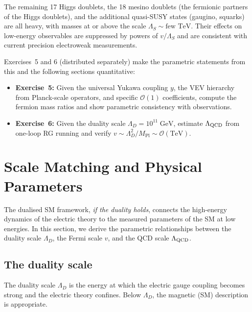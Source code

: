 \documentclass[11pt,a4paper]{article}
\begin{document}
The remaining 17 Higgs doublets, the 18 mesino doublets (the fermionic
partners of the Higgs doublets), and the additional quasi-SUSY states
(gaugino, squarks) are all heavy, with masses at or above the scale
$\Lambda_S \sim \text{few TeV}$.  Their effects on low-energy
observables are suppressed by powers of $v / \Lambda_S$ and are
consistent with current precision electroweak measurements.

\begin{previewbox}[title={Preview: Exercises 5 and 6}]
  Exercises~5 and 6 (distributed separately) make the parametric
  statements from this and the following sections quantitative:
  \begin{itemize}
    \item \textbf{Exercise~5:} Given the universal Yukawa coupling $y$,
      the VEV hierarchy from Planck-scale operators, and specific
      $\mathcal{O}(1)$ coefficients, compute the fermion mass ratios
      and show parametric consistency with observations.
    \item \textbf{Exercise~6:} Given the duality scale
      $\Lambda_D = 10^{11}\;\text{GeV}$, estimate $\Lambda_{\mathrm{QCD}}$ from
      one-loop RG running and verify $v \sim \Lambda_D^2 / M_{\text{Pl}}
      \sim \mathcal{O}(\text{TeV})$.
  \end{itemize}
\end{previewbox}


\section{Scale Matching and Physical Parameters}
\label{sec:scale-matching}

The dualised SM framework, \emph{if the duality holds}, connects the
high-energy dynamics of the electric theory to the measured parameters
of the SM at low energies.  In this section, we derive the parametric
relationships between the duality scale $\Lambda_D$, the Fermi scale
$v$, and the QCD scale $\Lambda_{\mathrm{QCD}}$.

\subsection{The duality scale}

The duality scale $\Lambda_D$ is the energy at which the electric gauge
coupling becomes strong and the electric theory confines.  Below
$\Lambda_D$, the magnetic (SM) description is appropriate.
\end{document}
